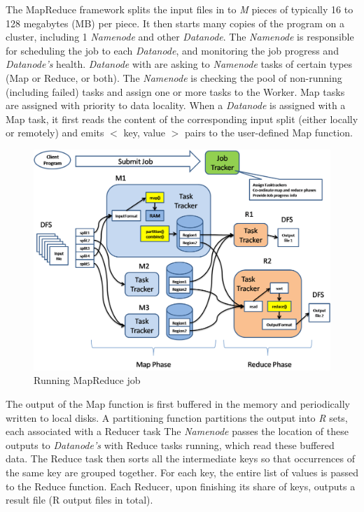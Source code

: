 \documentclass[a4paper,12pt,oneside]{report}
\begin{document}
The MapReduce framework splits the input files in to \emph{M} pieces of typically 16 to 128
megabytes (MB) per piece. It then starts many copies of the program on a cluster, including 1
\emph{Namenode} and other \emph{Datanode}. The \emph{Namenode}  is responsible for scheduling the job to each
\emph{Datanode}, and monitoring the job progress and \emph{Datanode’s} health.
\emph{Datanode} with are asking to \emph{Namenode} tasks of certain types (Map
or Reduce, or both). The \emph{Namenode} is checking the pool of non-running (including failed) tasks
and assign one or more tasks to the Worker. Map tasks are assigned with priority to
data locality. When a \emph{Datanode} is assigned with a Map task, it first reads the content of the
corresponding input split (either locally or remotely) and emits $<$ key, value $>$ pairs to the
user-defined Map function.
\begin{figure}[h!]
    \centering
    \includegraphics[width=1\textwidth]{./img/hadoop/map_reduce_architecture.png}
    \caption[mapreduce flow]{\centering Running MapReduce job}
 \end{figure} 
The output of the Map function is first buffered in the memory and periodically written
to local disks. A partitioning function partitions the output into \emph{R} sets, each associated with
a Reducer task The \emph{Namenode} passes the location of these outputs to \emph{Datanode’s} with Reduce tasks
running, which read these buffered data. The Reduce task
then sorts all the intermediate keys so that occurrences of the same key are grouped together.
For each key, the entire list of values is passed to the Reduce function. Each Reducer, upon
finishing its share of keys, outputs a result file (R output files in total).
\end{document}
